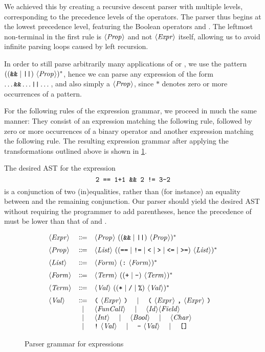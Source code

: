 We achieved this by creating a recursive descent parser with multiple levels,
corresponding to the precedence levels of the operators.
The parser thus begins at the lowest precedence level, featuring the Boolean
operators \code{\&\&} and \code{||}.
The leftmost non-terminal in the first rule is $\langle \textit{Prop}\kern.7pt \rangle$ and not $\langle \textit{Expr}\kern.7pt \rangle$
itself, allowing us to avoid infinite parsing loops caused by left recursion.

In order to still parse arbitrarily many applications of \code{\&\&} or
\code{||}, we use the pattern $((\texttt{\&\&} \mid \texttt{||})\ \langle \textit{Prop}\kern.7pt \rangle)^*$,
hence we can parse any expression of the form $\dots \texttt{\&\&} \dots \texttt{||} \dots$,
and also simply a $\langle \textit{Prop}\kern.7pt \rangle$, since $*$ denotes zero or more occurrences of
a pattern.

For the following rules of the expression grammar, we proceed in much the same
manner: They consist of an expression matching the following rule, followed
by zero or more occurrences of a binary operator and another expression matching
the following rule. The resulting expression grammar after applying the
transformations outlined above is shown in \cref{fig:new-expr-grammar}.

The desired AST for the expression
\[ \texttt{2 == 1+1 \&\& 2 != 3-2} \]
is a conjunction of two (in)equalities, rather than (for instance) an equality
between  and the remaining conjunction.
Our parser should yield the desired AST without requiring the programmer to add
parentheses, hence the precedence of \code{\&\&} must be lower than that of
\code{==} and \code{!=}.

\begin{figure}[h]
  \[
  \begin{array}{lcl}
		\NT{Expr} & \Coloneqq & \NT{Prop}\ ((\code{\&\&} \mid \code{||})\ \NT{Prop})^* \br
		\NT{Prop} & \Coloneqq & \NT{List}\ ((\code{==} \mid \code{!=} \mid \code{<} \mid \code{>} \mid \code{<=} \mid \code{>=})\ \NT{List})^* \br
		\NT{List} & \Coloneqq & \NT{Form}\ (\code{:}\ \NT{Form})^* \br
		\NT{Form} & \Coloneqq & \NT{Term}\ (( \code{+} \mid \code{-} )\ \NT{Term})^* \br
		\NT{Term} & \Coloneqq & \NT{Val}\ (( \code{*} \mid \code{/} \mid \code{\%} )\ \NT{Val} )^* \br
		\NT{Val} & \Coloneqq & \code{(}\ \NT{Expr}\ \code{)} \ruleSep
      \code{(}\ \NT{Expr}\ \code{,}\ \NT{Expr}\ \code{)} \\
		& \mid & \NT{FunCall} \ruleSep
      \NT{Id} \NT{Field} \\
    & \mid & \NT{Int} \ruleSep \NT{Bool} \ruleSep \NT{Char} \\
		& \mid & \code{!}\ \NT{Val} \ruleSep \code{-}\ \NT{Val} \ruleSep \code{[]}
  \end{array}
  \]
  \caption{Parser grammar for expressions}
  \label{fig:new-expr-grammar}
\end{figure}


